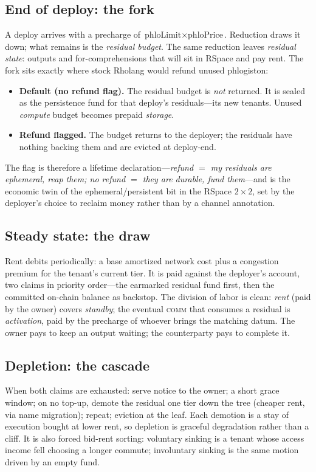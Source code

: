 \documentclass[11pt]{article}
\begin{document}
\subsection{End of deploy: the fork}
A deploy arrives with a precharge of $\text{phloLimit}\times\text{phloPrice}$. Reduction draws it down; what remains is the \emph{residual budget}. The same reduction leaves \emph{residual state}: outputs and for-comprehensions that will sit in RSpace and pay rent. The fork sits exactly where stock Rholang would refund unused phlogiston:
\begin{itemize}[leftmargin=1.4em]
  \item \textbf{Default (no refund flag).} The residual budget is \emph{not} returned. It is sealed as the persistence fund for that deploy's residuals---its new tenants. Unused \emph{compute} budget becomes prepaid \emph{storage}.
  \item \textbf{Refund flagged.} The budget returns to the deployer; the residuals have nothing backing them and are evicted at deploy-end.
\end{itemize}
The flag is therefore a lifetime declaration---\emph{refund $=$ my residuals are ephemeral, reap them; no refund $=$ they are durable, fund them}---and is the economic twin of the ephemeral/persistent bit in the RSpace $2\times2$, set by the deployer's choice to reclaim money rather than by a channel annotation.

\subsection{Steady state: the draw}
Rent debits periodically: a base amortized network cost plus a congestion premium for the tenant's current tier. It is paid against the deployer's account, two claims in priority order---the earmarked residual fund first, then the committed on-chain balance as backstop. The division of labor is clean: \emph{rent} (paid by the owner) covers \emph{standby}; the eventual \textsc{comm} that consumes a residual is \emph{activation}, paid by the precharge of whoever brings the matching datum. The owner pays to keep an output waiting; the counterparty pays to complete it.

\subsection{Depletion: the cascade}
When both claims are exhausted: serve notice to the owner; a short grace window; on no top-up, demote the residual one tier down the tree (cheaper rent, via name migration); repeat; eviction at the leaf. Each demotion is a stay of execution bought at lower rent, so depletion is graceful degradation rather than a cliff. It is also forced bid-rent sorting: voluntary sinking is a tenant whose access income fell choosing a longer commute; involuntary sinking is the same motion driven by an empty fund.
\end{document}
